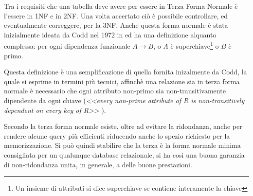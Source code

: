 Tra i requisiti che una tabella deve avere per essere in Terza Forma Normale è l'essere in 1NF e in 2NF. Una volta accertato ciò è possibile controllare, ed eventualmente correggere, per la 3NF. Anche questa forma normale è stata inizialmente ideata da Codd nel 1972 in \cite{codd:relationalmodel} ed ha una definizione alquanto complessa: per ogni dipendenza funzionale $A \rightarrow B$, o $A$ è superchiave\footnote{Un insieme di attributi si dice superchiave se contiene interamente la chiave} o $B$ è primo. 

Questa definizione è una semplificazione di quella fornita inizalmente da Codd, la quale si esprime in termini più tecnici, affinchè una relazione sia in terza forma normale è necessario che ogni attributo non-primo sia non-transitivamente dipendente da ogni chiave (\emph{<<every non-prime attribute of R is non-transitively dependent on every key of R>>} \cite{codd:relationalmodel}).

Secondo \textcite{techopedia} la terza forma normale esiste, oltre ad evitare la ridondanza, anche per rendere alcune query più efficienti riducendo anche lo spezio richiesto per la memorizzazione. Si può quindi stabilire che la terza è la forma normale minima consigliata per un qualunque database relazionale, si ha così una buona garanzia di non-ridondanza unita, in generale, a delle buone prestazioni.